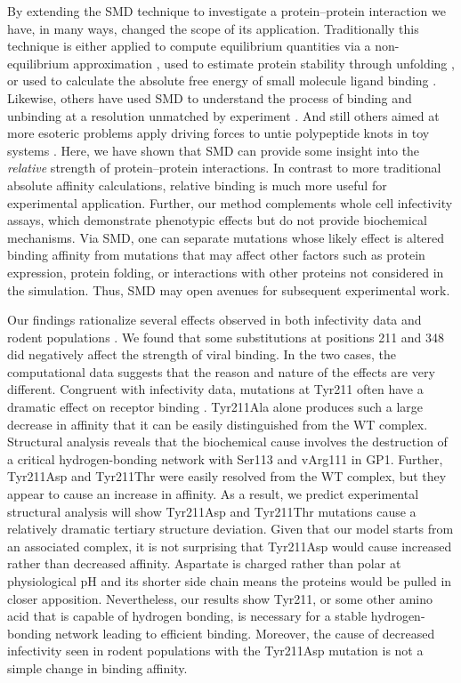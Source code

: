 \documentclass[12pt]{article}
\begin{document}
By extending the SMD technique to investigate a protein--protein interaction we have, in many ways, changed the scope of its application. Traditionally this technique is either applied to compute equilibrium quantities via a non-equilibrium approximation \citep{Park2003,Park2004,Buch2011,Giorgino2012}, used to estimate protein stability through unfolding \citep{Lu1999}, or used to calculate the absolute free energy of small molecule ligand binding \citep{Dixit2001}. Likewise, others have used SMD to understand the process of binding and unbinding at a resolution unmatched by experiment \citep{Cuendet2011,Giorgino2012}. And still others aimed at more esoteric problems apply driving forces to untie polypeptide knots in toy systems \citep{Sulkowska2010}. Here, we have shown that SMD can provide some insight into the \textit{relative} strength of protein--protein interactions. In contrast to more traditional absolute affinity calculations, relative binding is much more useful for experimental application. Further, our method complements whole cell infectivity assays, which demonstrate phenotypic effects but do not provide biochemical mechanisms. Via SMD, one can separate mutations whose likely effect is altered binding affinity from mutations that may affect other factors such as protein expression, protein folding, or interactions with other proteins not considered in the simulation. Thus, SMD may open avenues for subsequent experimental work.

Our findings rationalize several effects observed in both infectivity data and rodent populations \citep{Rad2008,Rad20111}. We found that some substitutions at positions 211 and 348 did negatively affect the strength of viral binding. In the two cases, the computational data suggests that the reason and nature of the effects are very different. Congruent with infectivity data, mutations at Tyr211 often have a dramatic effect on receptor binding \citep{Rad2008,Rad20111}. Tyr211Ala alone produces such a large decrease in affinity that it can be easily distinguished from the WT complex. Structural analysis reveals that the biochemical cause involves the destruction of a critical hydrogen-bonding network with Ser113 and vArg111 in GP1. Further, Tyr211Asp and Tyr211Thr were easily resolved from the WT complex, but they appear to cause an increase in affinity. As a result, we predict experimental structural analysis will show Tyr211Asp and Tyr211Thr mutations cause a relatively dramatic tertiary structure deviation. Given that our model starts from an associated complex, it is not surprising that Tyr211Asp would cause increased rather than decreased affinity. Aspartate is charged rather than polar at physiological pH and its shorter side chain means the proteins would be pulled in closer apposition. Nevertheless, our results show Tyr211, or some other amino acid that is capable of hydrogen bonding, is necessary for a stable hydrogen-bonding network leading to efficient binding. Moreover, the cause of decreased infectivity seen in rodent populations with the Tyr211Asp mutation is not a simple change in binding affinity.
\end{document}
